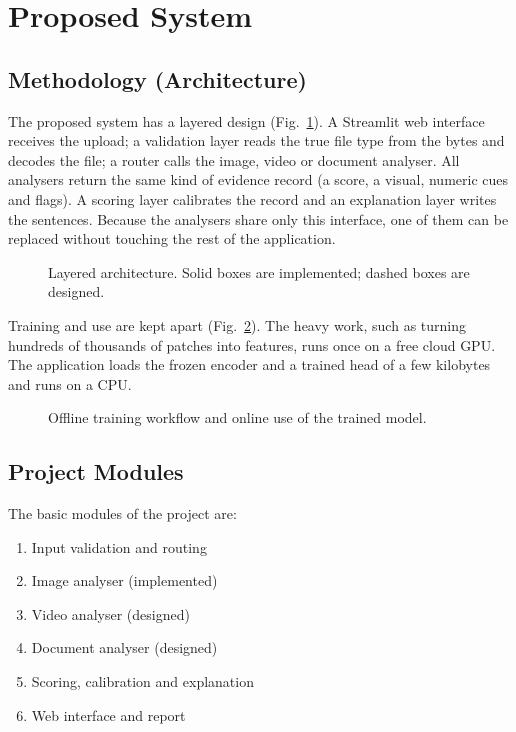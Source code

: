 \documentclass[12pt,a4paper]{article}
\begin{document}
\section{Proposed System}
\subsection{Methodology (Architecture)}
The proposed system has a layered design (Fig.~\ref{fig:arch}). A Streamlit web interface receives the upload; a validation layer reads the true file type from the bytes and decodes the file; a router calls the image, video or document analyser. All analysers return the same kind of evidence record (a score, a visual, numeric cues and flags). A scoring layer calibrates the record and an explanation layer writes the sentences. Because the analysers share only this interface, one of them can be replaced without touching the rest of the application.

\begin{figure}[htbp]
  \centering
  
  \caption{Layered architecture. Solid boxes are implemented; dashed boxes are designed.}\label{fig:arch}
\end{figure}

Training and use are kept apart (Fig.~\ref{fig:train}). The heavy work, such as turning hundreds of thousands of patches into features, runs once on a free cloud GPU. The application loads the frozen encoder and a trained head of a few kilobytes and runs on a CPU.

\begin{figure}[htbp]
  \centering
  
  \caption{Offline training workflow and online use of the trained model.}\label{fig:train}
\end{figure}

\subsection{Project Modules}
The basic modules of the project are:
\begin{enumerate}[label=\arabic*)]
  \item Input validation and routing
  \item Image analyser (implemented)
  \item Video analyser (designed)
  \item Document analyser (designed)
  \item Scoring, calibration and explanation
  \item Web interface and report
\end{enumerate}
\end{document}
